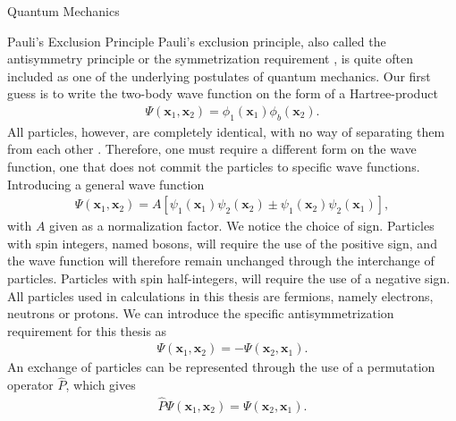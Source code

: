 \documentclass[twoside,english]{uiofysmaster}
\begin{document}
\begin{chapter}{Quantum Mechanics}
 	\begin{section}{Pauli's Exclusion Principle}
 		Pauli's exclusion principle, also called the
                antisymmetry principle or the symmetrization
                requirement \cite{Szabo,Griffiths}, is quite often
                included as one of the underlying postulates of
                quantum mechanics. Our first guess is to write  the two-body wave
                function on the form of a Hartree-product
 		\begin{align}
 			\Psi(\mathbf{x}_1,\mathbf{x}_2) = \phi_1({\mathbf{x}_1}) \phi_b(\mathbf{x}_2).
 		\end{align}
All particles, however, are completely identical, with no way of separating them from each other \cite{Griffiths}. Therefore, one must require a different form on the wave function, one that does not commit the particles to specific wave functions. Introducing a general wave function
 		\begin{align}
 			\Psi(\mathbf{x}_1,\mathbf{x}_2) = A[\psi_1(\mathbf{x}_1) \psi_2(\mathbf{x}_2) \pm \psi_1(\mathbf{x}_2) \psi_2(\mathbf{x}_1)],
 		\end{align}
 		with $A$ given as a normalization factor. We notice the choice of sign. Particles with spin integers, named bosons, will require the use of the positive sign, and the wave function will therefore remain unchanged through the interchange of particles. Particles with spin half-integers, will require the use of a negative sign. All particles used in calculations in this thesis are fermions, namely electrons, neutrons or protons. We can introduce the specific antisymmetrization requirement for this thesis as
 		\begin{align}
 			\Psi(\mathbf{x}_1,\mathbf{x}_2) = -\Psi(\mathbf{x}_2,\mathbf{x}_1).
 		\end{align}
 		An exchange of particles can be represented through the use of a permutation operator $\hat P$, which gives 
 		\begin{align}
 			\hat P \Psi(\mathbf{x}_1,\mathbf{x}_2) = \Psi(\mathbf{x}_2,\mathbf{x}_1).
 		\end{align}
 	\end{section}


\end{chapter}
\end{document}
